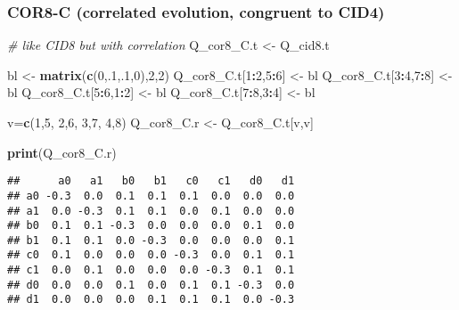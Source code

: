 \documentclass[
]{article}
\newenvironment{Shaded}{\begin{snugshade}}{\end{snugshade}}
\newcommand{\CommentTok}[1]{\textcolor[rgb]{0.56,0.35,0.01}{\textit{#1}}}
\newcommand{\DecValTok}[1]{\textcolor[rgb]{0.00,0.00,0.81}{#1}}
\newcommand{\FunctionTok}[1]{\textcolor[rgb]{0.13,0.29,0.53}{\textbf{#1}}}
\newcommand{\NormalTok}[1]{#1}
\newcommand{\OtherTok}[1]{\textcolor[rgb]{0.56,0.35,0.01}{#1}}
\newcommand{\SpecialCharTok}[1]{\textcolor[rgb]{0.81,0.36,0.00}{\textbf{#1}}}
\begin{document}
\hypertarget{cor8-c-correlated-evolution-congruent-to-cid4}{%
\subsubsection{COR8-C (correlated evolution, congruent to CID4)}\label{cor8-c-correlated-evolution-congruent-to-cid4}}

\begin{Shaded}
\begin{Highlighting}[]
\CommentTok{\# like CID8 but with correlation}
\NormalTok{Q\_cor8\_C.t }\OtherTok{\textless{}{-}}\NormalTok{ Q\_cid8.t}

\NormalTok{bl }\OtherTok{\textless{}{-}} \FunctionTok{matrix}\NormalTok{(}\FunctionTok{c}\NormalTok{(}\DecValTok{0}\NormalTok{,.}\DecValTok{1}\NormalTok{,.}\DecValTok{1}\NormalTok{,}\DecValTok{0}\NormalTok{),}\DecValTok{2}\NormalTok{,}\DecValTok{2}\NormalTok{)}
\NormalTok{Q\_cor8\_C.t[}\DecValTok{1}\SpecialCharTok{:}\DecValTok{2}\NormalTok{,}\DecValTok{5}\SpecialCharTok{:}\DecValTok{6}\NormalTok{] }\OtherTok{\textless{}{-}}\NormalTok{ bl}
\NormalTok{Q\_cor8\_C.t[}\DecValTok{3}\SpecialCharTok{:}\DecValTok{4}\NormalTok{,}\DecValTok{7}\SpecialCharTok{:}\DecValTok{8}\NormalTok{] }\OtherTok{\textless{}{-}}\NormalTok{ bl}
\NormalTok{Q\_cor8\_C.t[}\DecValTok{5}\SpecialCharTok{:}\DecValTok{6}\NormalTok{,}\DecValTok{1}\SpecialCharTok{:}\DecValTok{2}\NormalTok{] }\OtherTok{\textless{}{-}}\NormalTok{ bl}
\NormalTok{Q\_cor8\_C.t[}\DecValTok{7}\SpecialCharTok{:}\DecValTok{8}\NormalTok{,}\DecValTok{3}\SpecialCharTok{:}\DecValTok{4}\NormalTok{] }\OtherTok{\textless{}{-}}\NormalTok{ bl}

\NormalTok{v}\OtherTok{=}\FunctionTok{c}\NormalTok{(}\DecValTok{1}\NormalTok{,}\DecValTok{5}\NormalTok{, }\DecValTok{2}\NormalTok{,}\DecValTok{6}\NormalTok{, }\DecValTok{3}\NormalTok{,}\DecValTok{7}\NormalTok{, }\DecValTok{4}\NormalTok{,}\DecValTok{8}\NormalTok{)}
\NormalTok{Q\_cor8\_C.r }\OtherTok{\textless{}{-}}\NormalTok{ Q\_cor8\_C.t[v,v]}

\FunctionTok{print}\NormalTok{(Q\_cor8\_C.r)}
\end{Highlighting}
\end{Shaded}

\begin{verbatim}
##      a0   a1   b0   b1   c0   c1   d0   d1
## a0 -0.3  0.0  0.1  0.1  0.1  0.0  0.0  0.0
## a1  0.0 -0.3  0.1  0.1  0.0  0.1  0.0  0.0
## b0  0.1  0.1 -0.3  0.0  0.0  0.0  0.1  0.0
## b1  0.1  0.1  0.0 -0.3  0.0  0.0  0.0  0.1
## c0  0.1  0.0  0.0  0.0 -0.3  0.0  0.1  0.1
## c1  0.0  0.1  0.0  0.0  0.0 -0.3  0.1  0.1
## d0  0.0  0.0  0.1  0.0  0.1  0.1 -0.3  0.0
## d1  0.0  0.0  0.0  0.1  0.1  0.1  0.0 -0.3
\end{verbatim}
\end{document}
